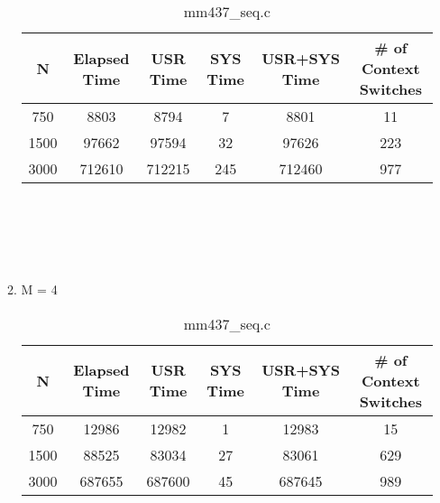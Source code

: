 \documentclass{article}
\begin{document}
\begin{enumerate}
\begin{enumerate}
\begin{table}[ht]
				\caption{mm437\_seq.c} %
				\centering %
				\begin{tabular}{c c c c c c} %
				\hline\hline %
				N & Elapsed Time & USR Time & SYS Time & USR+SYS Time & \# of Context Switches\\ [0.5ex] %
				\hline %
				750 & 8803 & 8794 & 7 & 8801 & 11 & \\
				1500 & 97662 & 97594 & 32 & 97626 & 223 & \\
				3000 & 712610 & 712215 & 245 & 712460 & 977 & \\ [1ex] %
				\hline %
				\end{tabular}
				\label{table:nonlin} %
				\end{table}
				\\
				\\
				\\
				\\
				\pagebreak
		\item M = 4 \\
				\begin{table}[ht]
				\caption{mm437\_seq.c} %
				\centering %
				\begin{tabular}{c c c c c c} %
				\hline\hline %
				N & Elapsed Time & USR Time & SYS Time & USR+SYS Time & \# of Context Switches\\ [0.5ex] %
				\hline %
				750 & 12986 & 12982 & 1 & 12983 & 15 & \\
				1500 & 88525 & 83034 & 27 & 83061 & 629 & \\
				3000 & 687655 & 687600 & 45 & 687645 & 989 & \\ [1ex] %
				\hline %
				\end{tabular}
				\label{table:nonlin} %
				\end{table}
			
		\end{enumerate}
		
		
		
\end{enumerate}
\end{document}
